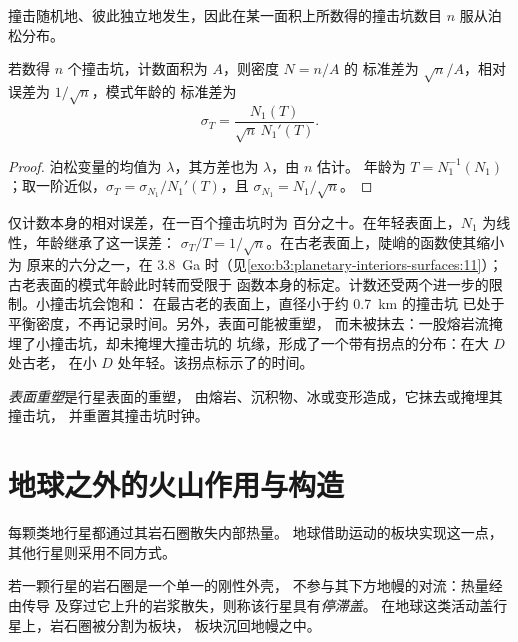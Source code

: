 
撞击随机地、彼此独立地发生，因此在某一面积上所数得的撞击坑数目
$n$ 服从泊松分布。

\begin{proposition}[模式年龄的计数误差]\label{prop:b3:planetary-interiors-surfaces:poisson}
若数得 $n$ 个撞击坑，计数面积为 $A$，则密度 $N = n/A$ 的
标准差为 $\sqrt n/A$，相对误差为 $1/\sqrt n$，模式年龄的
标准差为
\[
  \sigma_T = \frac{N_1(T)}{\sqrt n\,N_1'(T)} .
\]
\end{proposition}

\begin{proof}
泊松变量的均值为 $\lambda$，其方差也为 $\lambda$，由 $n$ 估计。
年龄为 $T = N_1^{-1}(N_1)$；取一阶近似，$\sigma_T =
\sigma_{N_1}/N_1'(T)$，且 $\sigma_{N_1} = N_1/\sqrt n$。
\end{proof}

仅计数本身的相对误差，在一百个撞击坑时为
百分之十。在年轻表面上，$N_1$ 为线性，年龄继承了这一误差：
$\sigma_T/T = 1/\sqrt n$。在古老表面上，陡峭的函数使其缩小为
原来的六分之一，在 \qty{3.8}{Ga} 时（见\cref{exo:b3:planetary-interiors-surfaces:11}）；
古老表面的模式年龄此时转而受限于
函数本身的标定。计数还受两个进一步的限制。小撞击坑会饱和：
在最古老的表面上，直径小于约 \qty{0.7}{km} 的撞击坑
已处于平衡密度，不再记录时间。另外，表面可能被重塑，
而未被抹去：一股熔岩流掩埋了小撞击坑，却未掩埋大撞击坑的
坑缘，形成了一个带有拐点的分布：在大 $D$ 处古老，
在小 $D$ 处年轻。该拐点标示了的时间。

\begin{definition}[表面重塑]\label{def:b3:planetary-interiors-surfaces:resurfacing}
\emph{表面重塑}是行星表面的重塑，
由熔岩、沉积物、冰或变形造成，它抹去或掩埋其撞击坑，
并重置其撞击坑时钟。
\end{definition}

\section{地球之外的火山作用与构造}\label{sec:b3:planetary-interiors-surfaces:volcanism}

每颗类地行星都通过其岩石圈散失内部热量。
地球借助运动的板块实现这一点，其他行星则采用不同方式。

\begin{definition}[停滞盖]\label{def:b3:planetary-interiors-surfaces:stagnant-lid}
若一颗行星的岩石圈是一个单一的刚性外壳，
不参与其下方地幔的对流：热量经由传导
及穿过它上升的岩浆散失，则称该行星具有\emph{停滞盖}。
在地球这类活动盖行星上，岩石圈被分割为板块，
板块沉回地幔之中。
\end{definition}

